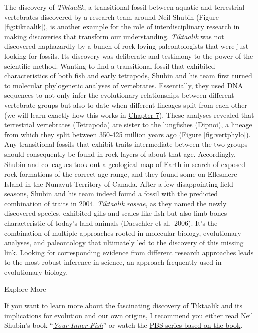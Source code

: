 \documentclass[
]{book}
\begin{document}
The discovery of \emph{Tiktaalik}, a transitional fossil between aquatic and terrestrial vertebrates discovered by a research team around Neil Shubin (Figure \ref{fig:tiktaalik}), is another example for the role of interdisciplinary research in making discoveries that transform our understanding. \emph{Tiktaalik} was not discovered haphazardly by a bunch of rock-loving paleontologists that were just looking for fossils. Its discovery was deliberate and testimony to the power of the scientific method. Wanting to find a transitional fossil that exhibited characteristics of both fish and early tetrapods, Shubin and his team first turned to molecular phylogenetic analyses of vertebrates. Essentially, they used DNA sequences to not only infer the evolutionary relationships between different vertebrate groups but also to date when different lineages split from each other (we will learn exactly how this works in \href{molecular-evolution.html}{Chapter 7}). These analyses revealed that terrestrial vertebrates (Tetrapoda) are sister to the lungfishes (Dipnoi), a lineage from which they split between 350-425 million years ago (Figure \ref{fig:vertphylo}). Any transitional fossils that exhibit traits intermediate between the two groups should consequently be found in rock layers of about that age. Accordingly, Shubin and colleagues took out a geological map of Earth in search of exposed rock formations of the correct age range, and they found some on Ellesmere Island in the Nunavut Territory of Canada. After a few disappointing field seasons, Shubin and his team indeed found a fossil with the predicted combination of traits in 2004. \emph{Tiktaalik roseae}, as they named the newly discovered species, exhibited gills and scales like fish but also limb bones characteristic of today's land animals (Daeschler et al.~2006). It's the combination of multiple approaches rooted in molecular biology, evolutionary analyses, and paleontology that ultimately led to the discovery of this missing link. Looking for corresponding evidence from different research approaches leads to the most robust inference in science, an approach frequently used in evolutionary biology.

Explore More

If you want to learn more about the fascinating discovery of Tiktaalik and its implications for evolution and our own origins, I recommend you either read Neil Shubin's book ``\href{https://www.amazon.com/Your-Inner-Fish-Journey-3-5-Billion-Year/dp/0307277453}{\emph{Your Inner Fish}}'' or watch the \href{https://www.pbs.org/your-inner-fish/}{PBS series based on the book}.
\end{document}

